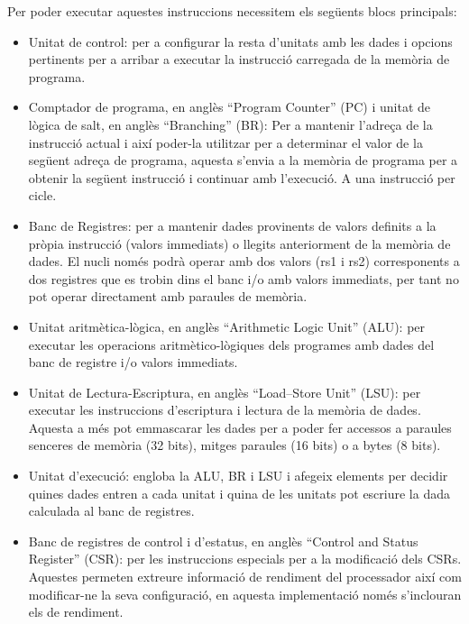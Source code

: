 \documentclass[10pt,a4paper,twocolumn,twoside]{article}
\begin{document}
    Per poder executar aquestes instruccions necessitem els següents blocs principals:
    \begin{itemize}
        \item Unitat de control: per a configurar la resta d'unitats amb les dades i opcions pertinents per a arribar a executar la instrucció carregada de la memòria de programa.
        \item Comptador de programa, en anglès ``Program Counter'' (PC) i unitat de lògica de salt, en anglès ``Branching'' (BR): Per a mantenir l'adreça de la instrucció actual i així poder-la utilitzar per a determinar el valor de la següent adreça de programa, aquesta s'envia a la memòria de programa per a obtenir la següent instrucció i continuar amb l'execució. A una instrucció per cicle.
        \item Banc de Registres: per a mantenir dades provinents de valors definits a la pròpia instrucció (valors immediats) o llegits anteriorment de la memòria de dades. El nucli només podrà operar amb dos valors (rs1 i rs2) corresponents a dos registres que es trobin dins el banc i/o amb valors immediats, per tant no pot operar directament amb paraules de memòria.
        \item Unitat aritmètica-lògica, en anglès ``Arithmetic Logic Unit'' (ALU): per executar les operacions aritmètico-lògiques dels programes amb dades del banc de registre i/o valors immediats.
        \item Unitat de Lectura-Escriptura, en anglès ``Load–Store Unit'' (LSU): per executar les instruccions d’escriptura i lectura de la memòria de dades. Aquesta a més pot emmascarar les dades per a poder fer accessos a paraules senceres de memòria (32 bits), mitges paraules (16 bits) o a bytes (8 bits).
        \item Unitat d'execució: engloba la ALU, BR i LSU i afegeix elements per decidir quines dades entren a cada unitat i quina de les unitats pot escriure la dada calculada al banc de registres.
        \item Banc de registres de control i d’estatus, en anglès ``Control and Status Register'' (CSR): per les instruccions especials per a la modificació dels CSRs. Aquestes permeten extreure informació de rendiment del processador així com modificar-ne la seva configuració, en aquesta implementació només s'inclouran els de rendiment.
    \end{itemize}
    
\end{document}
